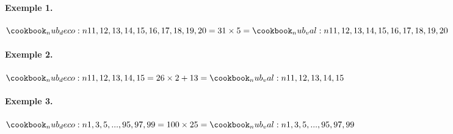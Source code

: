 \documentclass[border=3pt]{standalone}
\begin{document}
\begin{minipage}{12cm}

\paragraph{Exemple 1.}

$ \nub{11, 12, 13, 14, 15, 16, 17, 18, 19, 20}
= 31 \times 5
= \nub*{11, 12, 13, 14, 15, 16, 17, 18, 19, 20}$


\paragraph{Exemple 2.}

$ \nub{11, 12, 13, 14, 15}
= 26 \times 2 + 13
= \nub*{11, 12, 13, 14, 15}$


\paragraph{Exemple 3.}

$ \nub{1, 3, 5,..., 95, 97, 99}
= 100 \times 25
= \nub*{1, 3, 5,..., 95, 97, 99}$

\end{minipage}
\end{document}
